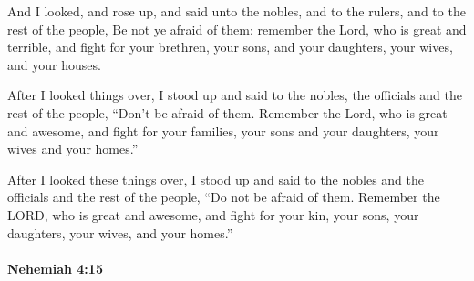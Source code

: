 			\begin{versebox}
					\item[BHS] 
					\item[LXX] 
					\item[ASV] And I looked, and rose up, and said unto the nobles, and to the rulers, and to the rest of the people, Be not ye afraid of them: remember the Lord, who is great and terrible, and fight for your brethren, your sons, and your daughters, your wives, and your houses.
					\item[NIV] After I looked things over, I stood up and said to the nobles, the officials and the rest of the people, “Don’t be afraid of them. Remember the Lord, who is great and awesome, and fight for your families, your sons and your daughters, your wives and your homes.”
					\item[NRSV] After I looked these things over, I stood up and said to the nobles and the officials and the rest of the people, “Do not be afraid of them. Remember the LORD, who is great and awesome, and fight for your kin, your sons, your daughters, your wives, and your homes.”
			\end{versebox}

		\paragraph{Nehemiah 4:15} %
			\label{NEHEMIAH-4-15}

